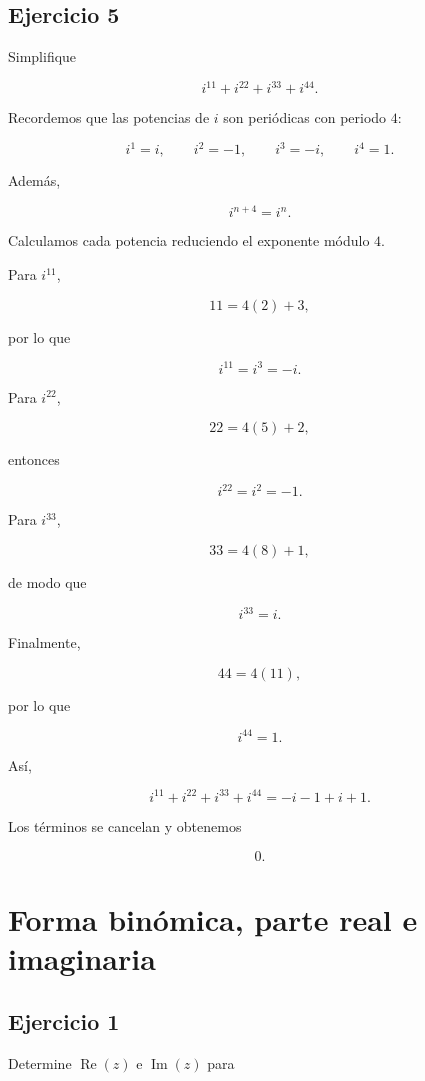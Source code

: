 \documentclass[12pt]{article}
\begin{document}
\subsection*{Ejercicio 5}

Simplifique

\[
i^{11}+i^{22}+i^{33}+i^{44}.
\]

Recordemos que las potencias de \(i\) son periódicas con periodo \(4\):

\[
i^1=i,\qquad
i^2=-1,\qquad
i^3=-i,\qquad
i^4=1.
\]

Además,

\[
i^{n+4}=i^n.
\]

Calculamos cada potencia reduciendo el exponente módulo \(4\).

Para \(i^{11}\),

\[
11=4(2)+3,
\]

por lo que

\[
i^{11}=i^3=-i.
\]

Para \(i^{22}\),

\[
22=4(5)+2,
\]

entonces

\[
i^{22}=i^2=-1.
\]

Para \(i^{33}\),

\[
33=4(8)+1,
\]

de modo que

\[
i^{33}=i.
\]

Finalmente,

\[
44=4(11),
\]

por lo que

\[
i^{44}=1.
\]

Así,

\[
i^{11}+i^{22}+i^{33}+i^{44}
=
-i-1+i+1.
\]

Los términos se cancelan y obtenemos

\[
\boxed{0}.
\]

\section*{Forma binómica, parte real e imaginaria}

\subsection*{Ejercicio 1}

Determine \(\operatorname{Re}(z)\) e \(\operatorname{Im}(z)\) para
\end{document}
